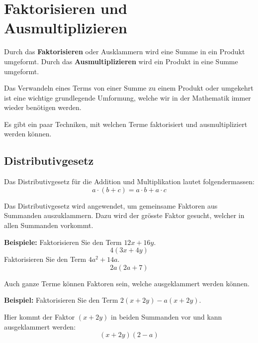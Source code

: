 \newpage
\section{Faktorisieren und Ausmultiplizieren}
Durch das \textbf{Faktorisieren} oder Ausklammern wird eine Summe in ein Produkt umgeformt. Durch das \textbf{Ausmultiplizieren} wird ein Produkt in eine Summe umgeformt.

\begin{center}
\end{center}

Das Verwandeln eines Terms von einer Summe zu einem Produkt oder umgekehrt ist eine wichtige grundlegende Umformung, welche wir in der Mathematik immer wieder benötigen werden.

Es gibt ein paar Techniken, mit welchen Terme faktorisiert und ausmultipliziert werden können.

\subsection{Distributivgesetz}

Das Distributivgesetz für die Addition und Multiplikation lautet folgendermassen:
\[
  a\cdot(b+c) = a\cdot b + a\cdot c
\]

Das Distributivgesetz wird angewendet, um gemeinsame Faktoren aus Summanden auszuklammern. Dazu wird der grösste Faktor gesucht, welcher in allen Summanden vorkommt.

\begin{example}
  \textbf{Beispiele:} Faktorisieren Sie den Term $12x+16y$.
  \[
    4(3x+4y)
  \]
  Faktorisieren Sie den Term $4a^{2}+14a$.
  \[
    2a(2a+7)
  \]
\end{example}

Auch ganze Terme können Faktoren sein, welche ausgeklammert werden können.

\begin{example}
  \textbf{Beispiel:} Faktorisieren Sie den Term $2(x+2y)-a(x+2y)$.

  Hier kommt der Faktor $(x+2y)$ in beiden Summanden vor und kann ausgeklammert werden:
  \[
    (x+2y)(2-a)
  \]
\end{example}

